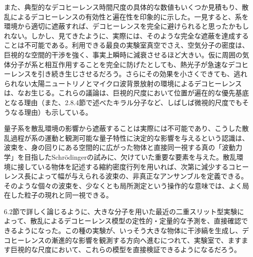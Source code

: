 また、典型的なデコヒーレンス時間尺度の具体的な数値もいくつか見積もり、散乱によるデコヒーレンスの有効性と遍在性を印象的に示した。一見すると、系を環境から適切に遮蔽すれば、デコヒーレンスを完全に避けられると思ったかもしれない。しかし、見てきたように、実際には、そのような完全な遮蔽を達成することは不可能である。利用できる最良の実験室真空でさえ、空気分子の密度は、巨視的な空間的干渉を強く、事実上瞬時に減衰させるほど大きい。仮に周囲の気体分子が系と相互作用することを完全に防げたとしても、熱光子が急速なデコヒーレンスを引き続き生じさせるだろう。さらにその効果を小さくできても、逃れられない太陽ニュートリノとマイクロ波背景放射の環境によるデコヒーレンスは、なお生じる。これらの議論は、巨視的尺度において位置が遍在的な優先基底となる理由（また、2.8.4節で述べたキラル分子など、しばしば微視的尺度でもそうなる理由）も示している。

\hypertarget{srcpage:151}{}\label{srcpage:151}
量子系を散乱環境の影響から遮蔽することは実際には不可能であり、こうした散乱過程が系の運動と観測可能な量子特性に決定的な影響を与えるという認識は、波束を、身の回りにある空間的に広がった物体と直接同一視する真の「波動力学」を目指したSchrödingerの試みに、欠けていた重要な要素を与えた。散乱環境に接している物体を記述する縮約密度行列を用いれば、次第に減少するコヒーレンス長によって幅が与えられる波束の、非真正なアンサンブルを定義できる。そのような個々の波束を、少なくとも局所測定という操作的な意味では、よく局在した粒子の現れと同一視できる。

6.2節で詳しく論じるように、大きな分子を用いた最近の二重スリット型実験によって、散乱によるデコヒーレンス模型の定性的・定量的な予測を、直接確認できるようになった。この種の実験が、いっそう大きな物体に干渉縞を生成し、デコヒーレンスの漸進的な影響を観測する方向へ進むにつれて、実験室で、ますます巨視的な尺度において、これらの模型を直接検証できるようになるだろう。

